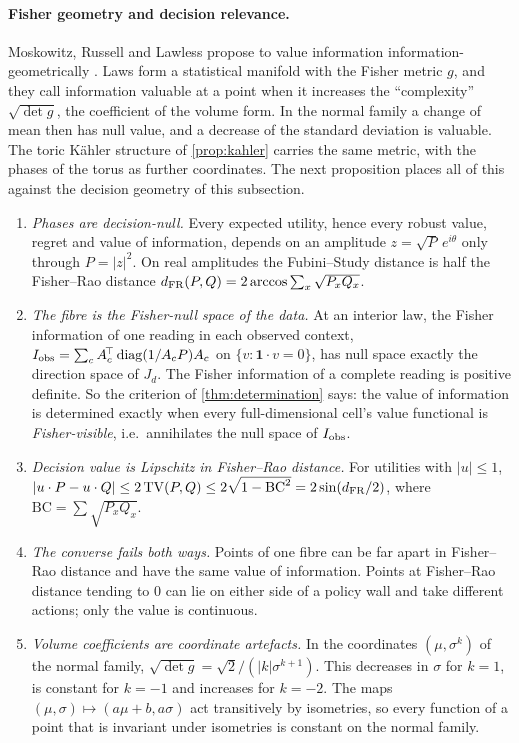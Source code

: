 \documentclass[11pt]{article}
\theoremstyle{definition}\newtheorem{definition}[theorem]{Definition}\newtheorem{remark}[theorem]{Remark}\newtheorem{example}[theorem]{Example}\newtheorem{problem}[theorem]{Open problem}\crefname{problem}{Problem}{Problems}
\begin{document}
\paragraph{Fisher geometry and decision relevance.} Moskowitz, Russell and Lawless propose to value information information-geometrically \cite{MoskowitzRussellLawless2020}. Laws form a statistical manifold with the Fisher metric $g$, and they call information valuable at a point when it increases the ``complexity'' $\sqrt{\det g}$, the coefficient of the volume form. In the normal family a change of mean then has null value, and a decrease of the standard deviation is valuable. The toric K\"ahler structure of \cref{prop:kahler} carries the same metric, with the phases of the torus as further coordinates. The next proposition places all of this against the decision geometry of this subsection.

\begin{proposition}\label{prop:fisher}
\begin{enumerate}
\item[(1)] \emph{Phases are decision-null.} Every expected utility, hence every robust value, regret and value of information, depends on an amplitude $z=\sqrt P\,e^{i\theta}$ only through $P=|z|^2$. On real amplitudes the Fubini--Study distance is half the Fisher--Rao distance $d_{\rm FR}(P,Q)=2\arccos\sum_x\sqrt{P_xQ_x}$.
\item[(2)] \emph{The fibre is the Fisher-null space of the data.} At an interior law, the Fisher information of one reading in each observed context, $I_{\rm obs}=\sum_cA_c^{\!\top}\operatorname{diag}(1/A_cP)A_c$ on $\{v:\mathbf 1\cdot v=0\}$, has null space exactly the direction space of $J_d$. The Fisher information of a complete reading is positive definite. So the criterion of \cref{thm:determination} says: the value of information is determined exactly when every full-dimensional cell's value functional is \emph{Fisher-visible}, i.e.\ annihilates the null space of $I_{\rm obs}$.
\item[(3)] \emph{Decision value is Lipschitz in Fisher--Rao distance.} For utilities with $|u|\le1$, $|u\cdot P-u\cdot Q|\le2\,\mathrm{TV}(P,Q)\le2\sqrt{1-\mathrm{BC}^2}=2\sin(d_{\rm FR}/2)$, where $\mathrm{BC}=\sum\sqrt{P_xQ_x}$.
\item[(4)] \emph{The converse fails both ways.} Points of one fibre can be far apart in Fisher--Rao distance and have the same value of information. Points at Fisher--Rao distance tending to $0$ can lie on either side of a policy wall and take different actions; only the value is continuous.
\item[(5)] \emph{Volume coefficients are coordinate artefacts.} In the coordinates $(\mu,\sigma^k)$ of the normal family, $\sqrt{\det g}=\sqrt2/(|k|\sigma^{k+1})$. This decreases in $\sigma$ for $k=1$, is constant for $k=-1$ and increases for $k=-2$. The maps $(\mu,\sigma)\mapsto(a\mu+b,a\sigma)$ act transitively by isometries, so every function of a point that is invariant under isometries is constant on the normal family.
\end{enumerate}
\end{proposition}
\end{document}
